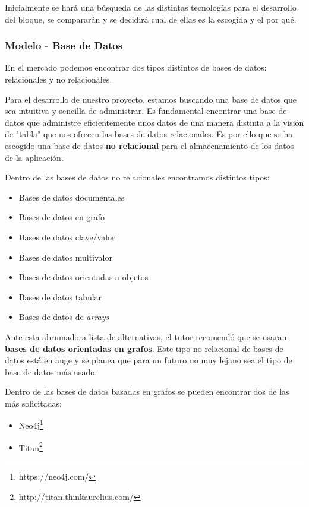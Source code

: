 Inicialmente se hará una búsqueda de las distintas tecnologías para el desarrollo del bloque, se compararán y se decidirá cual de ellas es la escogida y el por qué.

\subsubsection{Modelo - Base de Datos}

En el mercado podemos encontrar dos tipos distintos de bases de datos: relacionales y no relacionales\cite{tipobd}. 

Para el desarrollo de nuestro proyecto, estamos buscando una base de datos que sea intuitiva y sencilla de administrar. Es fundamental encontrar una base de datos que administre eficientemente unos datos de una manera distinta a la visión de "tabla" que nos ofrecen las bases de datos relacionales. Es por ello que se ha escogido una base de datos \textbf{no relacional} para el almacenamiento de los datos de la aplicación.

Dentro de las bases de datos no relacionales encontramos distintos tipos:

\begin{itemize}
    \item Bases de datos documentales
    \item Bases de datos en grafo
    \item Bases de datos clave/valor
    \item Bases de datos multivalor
    \item Bases de datos orientadas a objetos
    \item Bases de datos tabular
    \item Bases de datos de \textit{arrays}
\end{itemize}

Ante esta abrumadora lista de alternativas, el tutor recomendó que se usaran\textbf{ bases de datos orientadas en grafos}. Este tipo no relacional de bases de datos está en auge y se planea que para un futuro no muy lejano sea el tipo de base de datos más usado\cite{bdnorel1}\cite{bdnorel2}. 

Dentro de las bases de datos basadas en grafos se pueden encontrar dos de las más solicitadas:

\begin{itemize}
    \item Neo4j\footnote{https://neo4j.com/}
    \item Titan\footnote{http://titan.thinkaurelius.com/}
\end{itemize}


